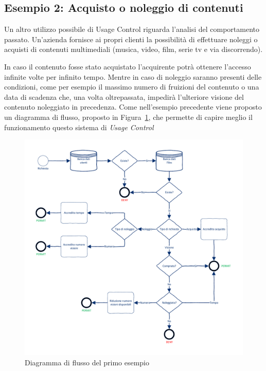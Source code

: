 \subsection*{Esempio 2: Acquisto o noleggio di contenuti}
Un altro utilizzo possibile di Usage Control riguarda l'analisi del comportamento passato. Un'azienda fornisce  ai propri clienti 
la possibilità di effettuare noleggi o acquisti di contenuti multimediali (musica, video, film, serie tv e via discorrendo).\\ \par
In caso il contenuto fosse stato acquistato l'acquirente potrà ottenere l'accesso infinite volte per infinito tempo. Mentre in caso di noleggio
saranno presenti delle condizioni, come per esempio il massimo numero di fruizioni del contenuto o una data di scadenza che, una volta oltrepassata, impedirà l'ulteriore visione del contenuto noleggiato in precedenza.
Come nell'esempio precedente viene proposto un diagramma di flusso, proposto in Figura~\ref{fig:diagrammaflussosecondoesempio}, che permette di capire meglio il funzionamento questo sistema di \textit{Usage Control}
\begin{figure}[H]
 \centering 
 \includegraphics[scale = 0.75]{./Visio_Project/DiagrammaFlussoSecondoEsempio.pdf}
 \caption{Diagramma di flusso del primo esempio}
 \label{fig:diagrammaflussosecondoesempio}
\end{figure}
